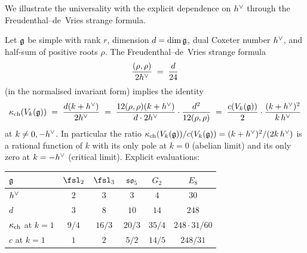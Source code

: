 We illustrate the universality with the explicit dependence on $h^{\vee}$
through the Freudenthal--de~Vries strange formula.

\begin{theorem}
\label{thm:h-dual-coxeter-coincidence}
\ClaimStatusProvedHere
Let $\mathfrak{g}$ be simple with rank $r$, dimension $d = \dim\mathfrak{g}$, dual
Coxeter number $h^{\vee}$, and half-sum of positive roots $\rho$. The
Freudenthal--de~Vries strange formula
\begin{equation}\label{eq:strange}
 \frac{(\rho, \rho)}{2h^{\vee}} \;=\; \frac{d}{24}
\end{equation}
(in the normalised invariant form) implies the identity
\begin{equation}\label{eq:kappa-vs-c}
 \kappa_{\mathrm{ch}}(V_k(\mathfrak{g}))
 \;=\; \frac{d(k + h^{\vee})}{2h^{\vee}}
 \;=\; \frac{12(\rho, \rho)(k + h^{\vee})}{d \cdot 2h^{\vee}}
 \cdot \frac{d^2}{12(\rho,\rho)}
 \;=\; \frac{c(V_k(\mathfrak{g}))}{2}
 \cdot \frac{(k + h^{\vee})^2}{k\,h^{\vee}}
\end{equation}
at $k \neq 0, -h^{\vee}$. In particular the ratio
$\kappa_{\mathrm{ch}}(V_k(\mathfrak{g}))/c(V_k(\mathfrak{g})) = (k + h^{\vee})^2 / (2k\,h^{\vee})$ is a rational
function of $k$ with its only pole at $k = 0$ (abelian limit) and
its only zero at $k = -h^{\vee}$ (critical limit). Explicit evaluations:
\begin{center}
\begin{tabular}{lccccc}
\toprule
$\mathfrak{g}$ & $\fsl_2$ & $\fsl_3$ & $\mathfrak{so}_5$ & $G_2$ & $E_8$ \\
\midrule
$h^{\vee}$ & $2$ & $3$ & $3$ & $4$ & $30$ \\
$d$ & $3$ & $8$ & $10$ & $14$ & $248$ \\
$\kappa_{\mathrm{ch}}$ at $k = 1$ & $9/4$ & $16/3$ & $20/3$ & $35/4$ & $248 \cdot 31 / 60$ \\
$c$ at $k = 1$ & $1$ & $2$ & $5/2$ & $14/5$ & $248 / 31$ \\
\bottomrule
\end{tabular}
\end{center}
\end{theorem}

